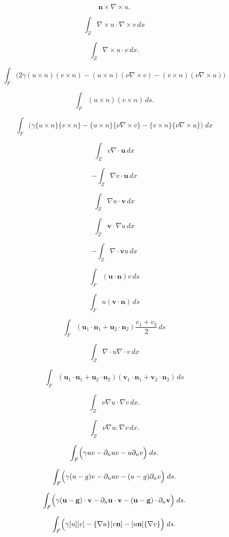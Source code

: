 \documentclass{article}
\begin{document}
\[ \mathbf n \times \nabla \times u. \]
\pagebreak

\[ \int_Z \nabla\!\times\! u \cdot \nabla\!\times\! v \,dx \]
\pagebreak

\[ \int_Z \nabla\!\times\! u \cdot v \,dx. \]
\pagebreak

\[ \int_F \biggl( 2\gamma (u\times n) (v\times n) - (u\times n)(\nu \nabla\times v) - (v\times n)(\nu \nabla\times u) \biggr) \]
\pagebreak

\[ \int_F (u\times n)(v\times n) \, ds. \]
\pagebreak

\[ \int_F \biggl( \gamma \{u\times n\}\{v\times n\} - \{u\times n\}\{\nu \nabla\times v\}- \{v\times n\}\{\nu \nabla\times u\} \biggr)\;dx \]
\pagebreak

\[ \int_Z v\nabla \cdot \mathbf u \,dx \]
\pagebreak

\[ - \int_Z \nabla v \cdot \mathbf u \,dx \]
\pagebreak

\[ \int_Z \nabla u \cdot \mathbf v\,dx \]
\pagebreak

\[ \int_Z \mathbf v\cdot\nabla u \,dx \]
\pagebreak

\[ -\int_Z \nabla\cdot \mathbf v u \,dx \]
\pagebreak

\[ \int_F (\mathbf u\cdot \mathbf n) v \,ds \]
\pagebreak

\[ \int_F u (\mathbf v\cdot \mathbf n) \,ds \]
\pagebreak

\[ \int_F (\mathbf u_1\cdot \mathbf n_1 + \mathbf u_2 \cdot \mathbf n_2) \frac{v_1+v_2}{2} \,ds \]
\pagebreak

\[ \int_Z \nabla\!\cdot\!u \nabla\!\cdot\!v \,dx \]
\pagebreak

\[ \int_F (\mathbf u_1\cdot \mathbf n_1 + \mathbf u_2 \cdot \mathbf n_2) (\mathbf v_1\cdot \mathbf n_1 + \mathbf v_2 \cdot \mathbf n_2) \,ds \]
\pagebreak

\[ \int_Z \nu \nabla u \cdot \nabla v \, dx. \]
\pagebreak

\[ \int_Z \nu \nabla u : \nabla v \, dx. \]
\pagebreak

\[ \int_F \Bigl(\gamma u v - \partial_n u v - u \partial_n v\Bigr)\;ds. \]
\pagebreak

\[ \int_F \Bigl(\gamma (u-g) v - \partial_n u v - (u-g) \partial_n v\Bigr)\;ds. \]
\pagebreak

\[ \int_F \Bigl(\gamma (\mathbf u- \mathbf g) \cdot \mathbf v - \partial_n \mathbf u \cdot \mathbf v - (\mathbf u-\mathbf g) \cdot \partial_n \mathbf v\Bigr)\;ds. \]
\pagebreak

\[ \int_F \Bigl( \gamma [u][v] - \{\nabla u\}[v\mathbf n] - [u\mathbf n]\{\nabla v\} \Bigr) \; ds. \]
\pagebreak
\end{document}
